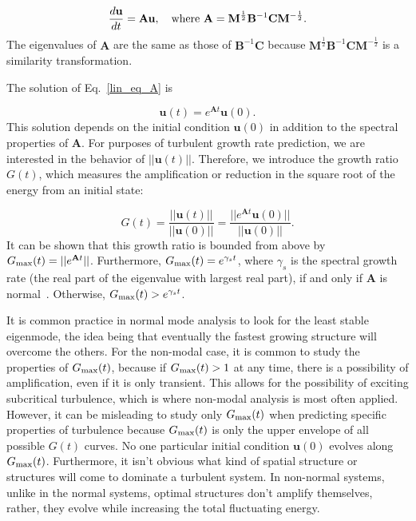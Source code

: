 \documentclass[showpacs,preprintnumbers,amsmath,amssymb,superscriptaddress,aip]{revtex4-1}
\def\beq{\begin{equation}}
\def\eeq{\end{equation}}
\newcommand{\diff}[2]{\frac{d#1}{d#2}}
\begin{document}
\beq
\label{lin_eq_A}
\diff{\mathbf{u}}{t} = \mathbf{A} \mathbf{u},  \quad \rm{where} \ \mathbf{A} = \mathbf{M}^{\frac{1}{2}} \mathbf{B}^{-1} \mathbf{C} \mathbf{M}^{-\frac{1}{2}}.
\eeq
The eigenvalues of $\mathbf{A}$ are the same as those of $\mathbf{B}^{-1} \mathbf{C}$ because $\mathbf{M}^{\frac{1}{2}} \mathbf{B}^{-1} \mathbf{C} \mathbf{M}^{-\frac{1}{2}}$ is a similarity transformation.

The solution of Eq.~\ref{lin_eq_A} is

\beq
\label{lin_soln}
\mathbf{u}(t) = e^{\mathbf{A} t} \mathbf{u}(0).
\eeq
This solution depends on the initial condition $\mathbf{u}(0)$ in addition to the spectral properties of $\mathbf{A}$. For purposes of turbulent growth rate prediction, we are interested in
the behavior of $||\mathbf{u}(t)||$. Therefore, we introduce the growth ratio $G(t)$, which measures the amplification or reduction in the square root of the energy from an initial state:

\beq
\label{g_def}
G(t) = \frac{||\mathbf{u}(t)||}{||\mathbf{u}(0)||} = \frac{||e^{\mathbf{A} t} \mathbf{u}(0)||}{||\mathbf{u}(0)||}.
\eeq
It can be shown that this growth ratio is bounded from above by $G_{\rm{max}}(t) = ||e^{\mathbf{A} t}||$. Furthermore, $G_{\rm{max}}(t) = e^{\gamma_s t}$, where $\gamma_s$ is the spectral growth rate
(the real part of the eigenvalue with largest real part), if and only if $\mathbf{A}$ is normal~\cite{schmid2007}. Otherwise, $G_{\rm{max}}(t) > e^{\gamma_s t}$. 

It is common practice in normal mode analysis to look for the least stable eigenmode, the idea being that eventually the fastest growing structure will overcome the others.
For the non-modal case, it is common to study the properties of $G_{\rm{max}}(t)$, because if $G_{\rm{max}}(t) > 1$ at any time, there is a possibility of amplification, even if it is only transient.
This allows for the possibility of exciting subcritical turbulence, which is where non-modal analysis is most often applied. 
However, it can be misleading to study only $G_{\rm{max}}(t)$ when predicting specific properties of turbulence because
$G_{\rm{max}}(t)$ is only the upper envelope of all possible $G(t)$ curves. No one particular initial condition $\mathbf{u}(0)$ evolves along $G_{\rm{max}}(t)$. 
Furthermore, it isn't obvious what kind of spatial structure or structures will come to dominate a turbulent system. 
In non-normal systems, unlike in the normal systems, optimal structures don't amplify themselves, rather, they evolve while increasing the total fluctuating energy.
\end{document}
